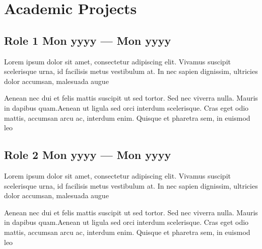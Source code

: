 \section{Academic Projects} %



\subsection*{Role 1 \hfill Mon yyyy --- Mon yyyy} 
    \begin{zitemize}
        \item Lorem ipsum dolor sit amet, consectetur adipiscing elit. Vivamus suscipit scelerisque urna, id facilisis metus vestibulum at. In nec sapien dignissim, ultricies dolor accumsan, malesuada augue 
        \item Aenean nec dui et felis mattis suscipit ut sed tortor. Sed nec viverra nulla. Mauris in dapibus quam.Aenean ut ligula sed orci interdum scelerisque. Cras eget odio mattis, accumsan arcu ac, interdum enim. Quisque et pharetra sem, in euismod leo 
    \end{zitemize}


\subsection*{Role 2 \hfill Mon yyyy --- Mon yyyy} 
    \begin{zitemize}
        \item Lorem ipsum dolor sit amet, consectetur adipiscing elit. Vivamus suscipit scelerisque urna, id facilisis metus vestibulum at. In nec sapien dignissim, ultricies dolor accumsan, malesuada augue 
        \item Aenean nec dui et felis mattis suscipit ut sed tortor. Sed nec viverra nulla. Mauris in dapibus quam.Aenean ut ligula sed orci interdum scelerisque. Cras eget odio mattis, accumsan arcu ac, interdum enim. Quisque et pharetra sem, in euismod leo 
    \end{zitemize}


